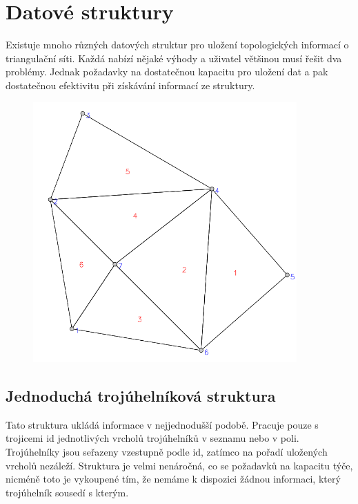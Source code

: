 \documentclass[12pt,a4paper]{article}
\begin{document}
\newpage
\section{Datové struktury}\label{sec:data_struct}

Existuje mnoho různých datových struktur pro uložení topologických informací o triangulační síti. Každá nabízí nějaké výhody a uživatel většinou musí řešit dva problémy. Jednak požadavky na dostatečnou kapacitu pro uložení dat a pak dostatečnou efektivitu při získávání informací ze struktury.


\begin{figure}[h!]
\centering
\includegraphics[width=0.9\textwidth]{../img/struct_triangulace.png}
\label{fig:struct_triangulace}
\end{figure}

\subsection{Jednoduchá trojúhelníková struktura}
Tato struktura ukládá informace v nejjednodušší podobě. Pracuje pouze s trojicemi id jednotlivých vrcholů trojúhelníků v seznamu nebo v poli. Trojúhelníky jsou seřazeny vzestupně podle id, zatímco na pořadí uložených vrcholů nezáleží. Struktura je velmi nenáročná, co se požadavků na kapacitu týče, nicméně toto je vykoupené tím, že nemáme k dispozici žádnou informaci, který trojúhelník sousedí s kterým.
\end{document}

